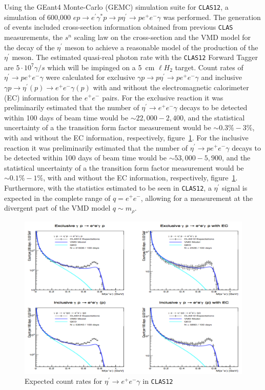 \documentclass{aip-cp}
\begin{document}
Using the GEant4 Monte-Carlo (GEMC) simulation suite for \textsc{\texttt{CLAS12}}, a simulation of 600,000 $e p \to e^{\prime} \gamma^* p \to p \eta^{\prime}  \to p e^+ e^- \gamma $ was performed. The generation of events included cross-section information obtained from previous \textsc{\texttt{CLAS}} measurements, the $s^n$ scaling law on the cross-section and the VMD model for the decay of the $\eta^{\prime}$ meson to achieve a reasonable model of the production of the $\eta^{\prime} $ meson. The estimated quasi-real photon rate with the \textsc{\texttt{CLAS12}} Forward Tagger are $5 \cdot 10^7 \gamma / s$ which will be impinged on  a 5~cm $\ell H_2$ target. Count rates of $ \eta^{\prime}  \to p e^+ e^- \gamma $ were calculated for exclusive $\gamma p \to p \eta^{\prime}  \to p e^+ e^- \gamma $ and inclusive $\gamma p \to \eta^{\prime} (p)  \to  e^+ e^- \gamma (p) $ with and without the electromagnetic calorimeter (EC) information for the $ e^+ e^- $ pairs. For the exclusive reaction it was preliminarily estimated that the number of  $ \eta^{\prime}  \to e^+ e^- \gamma $ decays to be detected within 100 days of beam time would be $\sim 22,000 - 2,400$, and the statistical uncertainty of a the transition form factor measurement would be $\sim 0.3 \% - 3 \%$, with and without the EC information, respectively, figure~\ref{fig:clas12_etaP}. For the inclusive reaction it was preliminarily estimated that the number of  $ \eta^{\prime}  \to p e^+ e^- \gamma $ decays to be detected within 100 days of beam time would be $\sim 53,000 - 5,900$, and the statistical uncertainty of a the transition form factor measurement would be $\sim 0.1 \% - 1 \%$, with and without the EC information, respectively, figure~\ref{fig:clas12_etaP}. Furthermore, with the statistics estimated to be seen in \textsc{\texttt{CLAS12}}, a $ \eta^{\prime} $ signal is expected in the complete range of $q = e^+ e^- $, allowing for a measurement at the divergent part of the VMD model $q\sim m_{\rho}$. 
\begin{figure}[h!]
	\centerline{\includegraphics[width=350 pt, height=255 pt]{figures/clas12_etaP.pdf}}
	\caption{Expected count rates for $ \eta^{\prime}  \to e^+ e^- \gamma $ in \textsc{\texttt{CLAS12}}}
	\label{fig:clas12_etaP}
\end{figure}
\end{document}
